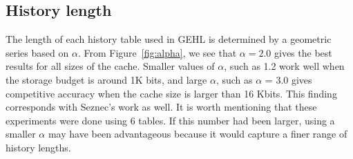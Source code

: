 \subsection{History length}
The length of each history table used in GEHL is determined by a geometric series based on $\alpha$. From Figure~\ref{fig:alpha}, we see that $\alpha=2.0$ gives the best results for all sizes of the cache.  Smaller values of $\alpha$, such as 1.2 work well when the storage budget is around 1K bits, and large $\alpha$, such as $\alpha$ = 3.0 gives competitive accuracy when the cache size is larger than 16 Kbits. This finding corresponds with Seznec's work as well.  It is worth mentioning that these experiments were done using 6 tables.  If this number had been larger, using a smaller $\alpha$ may have been advantageous because it would capture a finer range of history lengths.
